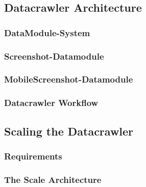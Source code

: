 \subsection{Datacrawler Architecture}
\label{datacrawler_architecture}

\subsubsection{DataModule-System}
\label{datacrawler_datamodulesystem}

\subsubsection{Screenshot-Datamodule}
\label{datacrawler_screenshot_datamodule}

\subsubsection{MobileScreenshot-Datamodule}
\label{datacrawler_mobilescreenshot_datamodule}


\subsubsection{Datacrawler Workflow}
\label{datacrawler_workflow}

\subsection{Scaling the Datacrawler}
\label{datacrawler_scale}

\subsubsection{Requirements}
\label{datacrawler_scale_requirements}

\subsubsection{The Scale Architecture}
\label{datacrawler_scale_architecture}


